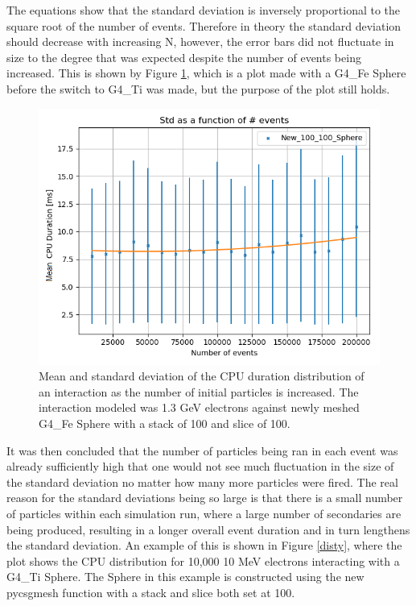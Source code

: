 \documentclass[12pt,a4paper]{article}
\begin{document}
The equations show that the standard deviation is inversely proportional to the square root of the number of events. Therefore in theory the standard deviation should decrease with increasing N, however, the error bars did not fluctuate in size to the degree that was expected despite the number of events being increased. This is shown by Figure \ref{err}, which is a plot made with a G4\_Fe Sphere before the switch to G4\_Ti was made, but the purpose of the plot still holds. 

\begin{figure}[h!]
\centering
\includegraphics[scale=0.6]{Images//Error//std_N1.png}
\caption[width=\columnwidth]{Mean and standard deviation of the CPU duration distribution of an interaction as the number of initial particles is increased. The interaction modeled was 1.3 GeV electrons against newly meshed G4\_Fe Sphere with a stack of 100 and slice of 100.}
\label{err}
\end{figure}

\noindent It was then concluded that the number of particles being ran in each event was already sufficiently high that one would not see much fluctuation in the size of the standard deviation no matter how many more particles were fired. The real reason for the standard deviations being so large is that there is a small number of particles within each simulation run, where a large number of secondaries are being produced, resulting in a longer overall event duration and in turn lengthens the standard deviation. An example of this is shown in Figure \ref{disty}, where the plot shows the CPU distribution for 10,000 10 MeV electrons interacting with a G4\_Ti Sphere. The Sphere in this example is constructed using the new pycsgmesh function with a stack and slice both set at 100.
\end{document}
